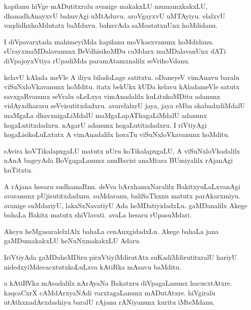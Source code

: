 \documentclass{article}
\begin{document}
\begin{mn}%
kapilanu hiVge mADutitxralu avanige makakxLU mumamxkakxLU, dhanadhAnayxvU bahuvAgi uMtAduvu. 
aroVgayxvU uMTAyiyu. elalxvU vaqdidhxhoMdutatx baMduvu. bahuvAda saMoatatxnUnx hoMdidanu.
\end{mn}

\begin{mn}%
I diVpavarxtada mahimeyiMda kapilanu moVkasxvanunx hoMdidanu. sUrayxmaMDalavanunx BeVdhisikoMDu 
caMdarx maMDalavanUnx dATi diVpajoyxVtiya rUpadiMda paramAtamxnalilx seVrihoVdanu.
\end{mn}

\begin{mn}%
kelavU kAlada meVle A iliyu biladoLage satitxtu. oDaneyeV vimAnavu baralu viSuNxloVkavanunx 
hoMditu. itatx bekUkx kUDa kelavu kAladameVle satutx savxgaRvanunx seVralu oLeLxya vimAnadalilx 
kuLitukoMDitu adanunx vidAyxdhararu seVvisutitxdadxru. avarelalxrU jaya, jaya eMba shabadxdiMdalU 
maMgaLa dhavxnigaLiMdalU maMgaLapAThagaLiMdalU adanunx hogaLutitxdadxru. nAgarU adanunx 
hogaLutitxdadxru. I riVtiyAgi hogaLisikoLuLxtatx A vimAnadalilx horaTu viSuNxloVkavanunx hoMditu.
\end{mn}

\begin{mn}%
sAvira koVTikalapxgaLU matutx nUru koTikalapxgaLU, A viSuNxloVkadalilx nAnA bageyAda BoVgagaLanunx 
anuBavisi anaMtara BUmiyalilx rAjanAgi huTitxtu.
\end{mn}

\begin{mn}%
A rAjana hesaru sudhamaRnu. deVva bArxhamxNaralilx BakitxyuLaLxvanAgi avaranunx pUjisutitxdadxnu. 
suMdaranu, baliSaThxnu matutx parAkarxmiyu. avanige suMdariyU, lakaSxNavatiyU Ada heMDatiyidadxLu. 
gaMDanalilx Akege bahaLa Bakitx matutx shiVlavati. avaLa hesaru rUpasuMdari.
\end{mn}

\begin{mn}%
Akeyu heMgasaralelxlAlx bahaLa cenAnxgidadxLu. Akege bahaLa jana gaMDumakakxLU heNuNxmakakxLU Adaru.
\end{mn}

\begin{mn}%
IriVtiyAda gaMDaheMDiru pirxVtiyiMdirutAtx suKadiMdirutitxralU hariyU nidedxyiMdecacxtutxkoLuLxva 
kAtiRka mAsavu baMditu.
\end{mn}

\begin{mn}%
a kAtiRVka mAsadalilx nArAyaNa Bakatxru diVpagaLanunx hacucxtAtxre. kaqcaCxrX cAMdArxyaNAdi 
varxtagaLanunx mADutAtxre. hiVgiralu utAthxnadAvxdashiyu baralU rAjanu rANiyanunx kuritu iMteMdanu.
\end{mn}
\end{document}
